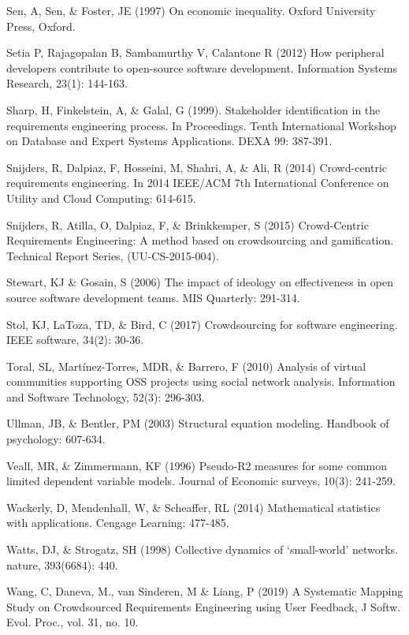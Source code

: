\begin{thebibliography}{}
Sen, A, Sen, \& Foster, JE (1997) On economic inequality. Oxford University Press, Oxford.

Setia P, Rajagopalan B, Sambamurthy V, Calantone R (2012) How peripheral developers contribute to open-source software development. Information Systems Research, 23(1): 144-163.

Sharp, H, Finkelstein, A, \& Galal, G (1999). Stakeholder identification in the requirements engineering process. In Proceedings. Tenth International Workshop on Database and Expert Systems Applications. DEXA 99: 387-391.

Snijders, R, Dalpiaz, F, Hosseini, M, Shahri, A, \& Ali, R (2014) Crowd-centric requirements engineering. In 2014 IEEE/ACM 7th International Conference on Utility and Cloud Computing: 614-615.

Snijders, R, Atilla, O, Dalpiaz, F, \& Brinkkemper, S (2015) Crowd-Centric Requirements Engineering: A method based on crowdsourcing and gamification. Technical Report Series, (UU-CS-2015-004).

Stewart, KJ \& Gosain, S (2006) The impact of ideology on effectiveness in open source software development teams. MIS Quarterly: 291-314.

Stol, KJ, LaToza, TD, \& Bird, C (2017) Crowdsourcing for software engineering. IEEE software, 34(2): 30-36.

Toral, SL, Martínez-Torres, MDR, \& Barrero, F (2010) Analysis of virtual communities supporting OSS projects using social network analysis. Information and Software Technology, 52(3): 296-303.

Ullman, JB, \& Bentler, PM (2003) Structural equation modeling. Handbook of psychology: 607-634.

Veall, MR, \& Zimmermann, KF (1996) Pseudo‐R2 measures for some common limited dependent variable models. Journal of Economic surveys, 10(3): 241-259.

Wackerly, D, Mendenhall, W, \& Scheaffer, RL (2014) Mathematical statistics with applications. Cengage Learning: 477-485.

Watts, DJ, \& Strogatz, SH (1998) Collective dynamics of ‘small-world’ networks. nature, 393(6684): 440.

Wang, C, Daneva, M.,  van Sinderen, M \& Liang, P (2019) A Systematic Mapping Study on Crowdsourced Requirements Engineering using User Feedback, J Softw. Evol. Proc., vol. 31, no. 10.


\end{thebibliography}

